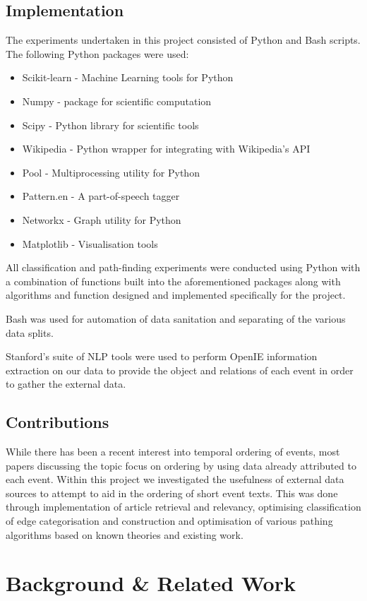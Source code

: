 \documentclass[bsc,frontabs,twoside,singlespacing,parskip,deptreport]{infthesis}     %
\begin{document}
\section{Implementation}
The experiments undertaken in this project consisted of Python and Bash scripts.
The following Python packages were used:
\begin{itemize}
\item Scikit-learn - Machine Learning tools for Python
\item Numpy - package for scientific computation
\item Scipy - Python library for scientific tools
\item Wikipedia - Python wrapper for integrating with Wikipedia's API
\item Pool - Multiprocessing utility for Python
\item Pattern.en - A part-of-speech tagger 
\item Networkx - Graph utility for Python
\item Matplotlib - Visualisation tools
\end{itemize}
All classification and path-finding experiments were conducted using Python with a combination of
functions built into the aforementioned packages along with algorithms and function designed and implemented
specifically for the project.

Bash was used for automation of data sanitation and separating of the various data splits. 

Stanford's suite of NLP tools were used to perform OpenIE information extraction on our data to provide the
object and relations of each event in order to gather the external data.
\section{Contributions}
While there has been a recent interest into temporal ordering of events, most papers discussing the topic focus on
ordering by using data already attributed to each event. Within this project we investigated the usefulness of
external data sources to attempt to aid in the ordering of short event texts. This was done through implementation
of article retrieval and relevancy, optimising classification of edge categorisation and construction and optimisation
of various pathing algorithms based on known theories and existing work. 
\chapter{Background \& Related Work}
\end{document}
